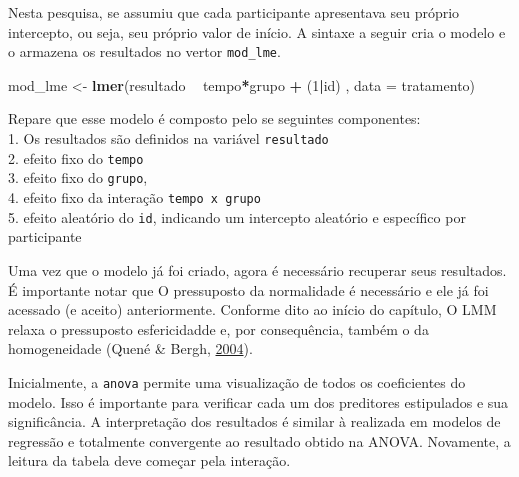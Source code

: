 \documentclass[
]{book}
\newenvironment{Shaded}{\begin{snugshade}}{\end{snugshade}}
\newcommand{\DataTypeTok}[1]{\textcolor[rgb]{0.13,0.29,0.53}{#1}}
\newcommand{\DecValTok}[1]{\textcolor[rgb]{0.00,0.00,0.81}{#1}}
\newcommand{\KeywordTok}[1]{\textcolor[rgb]{0.13,0.29,0.53}{\textbf{#1}}}
\newcommand{\NormalTok}[1]{#1}
\newcommand{\OperatorTok}[1]{\textcolor[rgb]{0.81,0.36,0.00}{\textbf{#1}}}
\newcommand{\StringTok}[1]{\textcolor[rgb]{0.31,0.60,0.02}{#1}}
\begin{document}
Nesta pesquisa, se assumiu que cada participante apresentava seu próprio
intercepto, ou seja, seu próprio valor de início. A sintaxe a seguir
cria o modelo e o armazena os resultados no vertor \texttt{mod\_lme}.

\begin{Shaded}
\begin{Highlighting}[]
\NormalTok{mod_lme <-}\StringTok{ }\KeywordTok{lmer}\NormalTok{(resultado }\OperatorTok{~}\StringTok{ }\NormalTok{tempo}\OperatorTok{*}\NormalTok{grupo }\OperatorTok{+}\StringTok{ }\NormalTok{(}\DecValTok{1}\OperatorTok{|}\NormalTok{id) , }\DataTypeTok{data =}\NormalTok{ tratamento)}
\end{Highlighting}
\end{Shaded}

Repare que esse modelo é composto pelo se seguintes componentes:\\
1. Os resultados são definidos na variável \texttt{resultado}\\
2. efeito fixo do \texttt{tempo}\\
3. efeito fixo do \texttt{grupo},\\
4. efeito fixo da interação \texttt{tempo\ x\ grupo}\\
5. efeito aleatório do \texttt{id}, indicando um intercepto aleatório e
específico por participante

Uma vez que o modelo já foi criado, agora é necessário recuperar seus
resultados. É importante notar que O pressuposto da normalidade é
necessário e ele já foi acessado (e aceito) anteriormente. Conforme dito
ao início do capítulo, O LMM relaxa o pressuposto esfericidadde e, por
consequência, também o da homogeneidade (Quené \& Bergh,
\protect\hyperlink{ref-Quen2004}{2004}).

Inicialmente, a \texttt{anova} permite uma visualização de todos os
coeficientes do modelo. Isso é importante para verificar cada um dos
preditores estipulados e sua significância. A interpretação dos
resultados é similar à realizada em modelos de regressão e totalmente
convergente ao resultado obtido na ANOVA. Novamente, a leitura da tabela
deve começar pela interação.

\begin{Shaded}
\end{Shaded}
\end{document}

